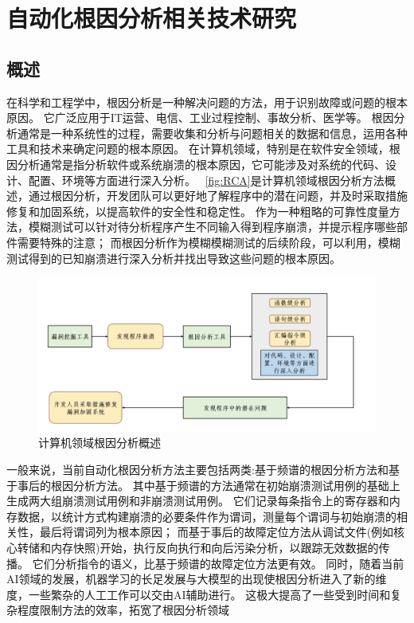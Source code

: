 \cleardoublepage
\section{自动化根因分析相关技术研究}        %
\subsection{概述}
在科学和工程学中，根因分析是一种解决问题的方法，用于识别故障或问题的根本原因。
它广泛应用于IT运营、电信、工业过程控制、事故分析、医学等。
根因分析通常是一种系统性的过程，需要收集和分析与问题相关的数据和信息，运用各种工具和技术来确定问题的根本原因。
在计算机领域，特别是在软件安全领域，根因分析通常是指分析软件或系统崩溃的根本原因，它可能涉及对系统的代码、设计、配置、环境等方面进行深入分析。
~\autoref{fig:RCA}是计算机领域根因分析方法概述，通过根因分析，开发团队可以更好地了解程序中的潜在问题，并及时采取措施修复和加固系统，以提高软件的安全性和稳定性。
作为一种粗略的可靠性度量方法，模糊测试可以针对待分析程序产生不同输入得到程序崩溃，并提示程序哪些部件需要特殊的注意；
而根因分析作为模糊模糊测试的后续阶段，可以利用，模糊测试得到的已知崩溃进行深入分析并找出导致这些问题的根本原因。
\begin{figure}[h]
    \centering
    \includegraphics[width=1.0\textwidth]{./figure/RCA.png}
    \caption{计算机领域根因分析概述}
    \label{fig:RCA}
\end{figure}

一般来说，当前自动化根因分析方法主要包括两类:基于频谱的根因分析方法和基于事后的根因分析方法。
其中基于频谱的方法通常在初始崩溃测试用例的基础上生成两大组崩溃测试用例和非崩溃测试用例。
它们记录每条指令上的寄存器和内存数据，以统计方式构建崩溃的必要条件作为谓词，测量每个谓词与初始崩溃的相关性，最后将谓词列为根本原因；
而基于事后的故障定位方法从调试文件(例如核心转储和内存快照)开始，执行反向执行和向后污染分析，以跟踪无效数据的传播。
它们分析指令的语义，比基于频谱的故障定位方法更有效。
同时，随着当前AI领域的发展，机器学习的长足发展与大模型的出现使根因分析进入了新的维度，一些繁杂的人工工作可以交由AI辅助进行。
这极大提高了一些受到时间和复杂程度限制方法的效率，拓宽了根因分析领域

